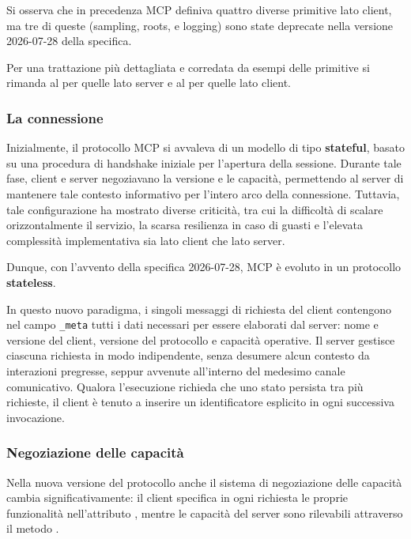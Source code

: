 Si osserva che in precedenza MCP definiva quattro diverse primitive lato
client, ma tre di queste (sampling, roots, e logging) sono state
deprecate nella versione 2026-07-28 della specifica.

Per una trattazione più dettagliata e corredata da esempi delle primitive 
si rimanda al  per quelle lato server e al  
per quelle lato client.

\subsubsection{La connessione}\label{la-connessione}

Inizialmente, il protocollo MCP si avvaleva di un modello di tipo
\textbf{stateful}, basato su una procedura di handshake iniziale per
l'apertura della sessione. Durante tale fase, client e server
negoziavano la versione e le capacità, permettendo al server di
mantenere tale contesto informativo per l'intero arco della connessione.
Tuttavia, tale configurazione ha mostrato diverse criticità, tra cui la
difficoltà di scalare orizzontalmente il servizio, la scarsa resilienza
in caso di guasti e l'elevata complessità implementativa sia lato client
che lato server.

Dunque, con l'avvento della specifica 2026-07-28, MCP è evoluto in un
protocollo \textbf{stateless}.

In questo nuovo paradigma, i singoli messaggi di richiesta del client
contengono nel campo \texttt{\_meta} tutti i dati necessari per essere elaborati
dal server: nome e versione del client, versione del protocollo e
capacità operative. Il server gestisce ciascuna richiesta in modo
indipendente, senza desumere alcun contesto da interazioni pregresse,
seppur avvenute all'interno del medesimo canale comunicativo. Qualora
l'esecuzione richieda che uno stato persista tra più richieste, il
client è tenuto a inserire un identificatore esplicito in ogni
successiva invocazione.

\subsubsection{Negoziazione delle
capacità}\label{negoziazione-delle-capacituxe0}

Nella nuova versione del protocollo anche il sistema di negoziazione
delle capacità cambia significativamente: il client specifica in ogni
richiesta le proprie funzionalità nell'attributo
, mentre le capacità
del server sono rilevabili attraverso il metodo .

